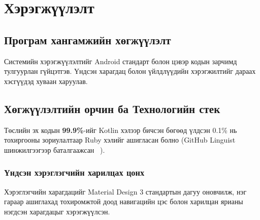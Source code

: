 \chapter{Хэрэгжүүлэлт}

\section{Програм хангамжийн хөгжүүлэлт}
Системийн хэрэгжүүлэлтийг Android стандарт болон цэвэр кодын зарчимд \cite{clean_code} тулгуурлан гүйцэтгэв. Үндсэн харагдац болон үйлдлүүдийн хэрэгжилтийг дараах хэсгүүдэд хуваан харуулав.
\section{Хөгжүүлэлтийн орчин ба Технологийн стек}
Төслийн эх кодын \textbf{99.9\%}-ийг Kotlin хэлээр бичсэн бөгөөд
үлдсэн 0.1\% нь тохиргооны зориулалтаар Ruby хэлийг ашигласан
болно (GitHub Linguist шинжилгээгээр баталгаажсан~ \cite{https://github.com/FossifyOrg/Messages}).

\begin{table}[H]
    \centering
    \caption{Технологийн стек ба сонголтын үндэслэл}
    \label{table:tech_stack}
\end{table}
\subsection{Үндсэн хэрэглэгчийн харилцах цонх}
Хэрэглэгчийн харагдацийг Material Design 3 стандартын дагуу оновчилж, нэг гараар ашиглахад тохиромжтой доод навигацийн цэс болон харилцан ярианы нэгдсэн харагдацыг хэрэгжүүлсэн.

